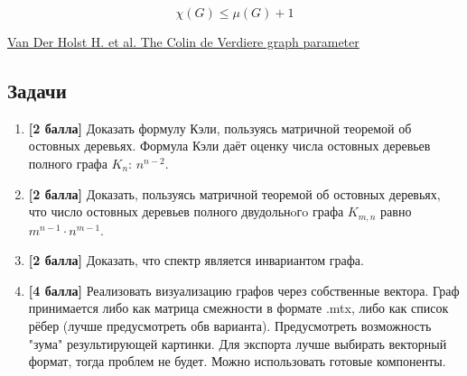\begin{conjecture}
$$\chi(G) \leq \mu(G) + 1$$
\end{conjecture}


\href{http://citeseerx.ist.psu.edu/viewdoc/summary?doi=10.1.1.39.914}{Van Der Holst H. et al. The Colin de Verdiere graph parameter}

\subsection{Задачи}
\begin{enumerate}
\item \textbf{[2 балла]} Доказать формулу Кэли, пользуясь матричной теоремой об остовных деревьях. Формула Кэли даёт оценку числа остовных деревьев полного графа $K_{n}$: $n^{n-2}$.
\item \textbf{[2 балла]} Доказать, пользуясь матричной теоремой об остовных деревьях, что число остовных деревьев полного двудольнoгo графа $K_{m,n}$ равно $m^{n-1}\cdot n^{m-1}$.
\item \textbf{[2 балла]} Доказать, что спектр является инвариантом графа.
\item \textbf{[4 балла]} Реализовать визуализацию графов через собственные вектора. Граф принимается либо как матрица смежности в формате .mtx, либо как список рёбер (лучше предусмотреть обв варианта). Предусмотреть возможность "зума" результирующей картинки. Для экспорта лучше выбирать векторный формат, тогда проблем не будет. Можно использовать готовые компоненты.
\end{enumerate}